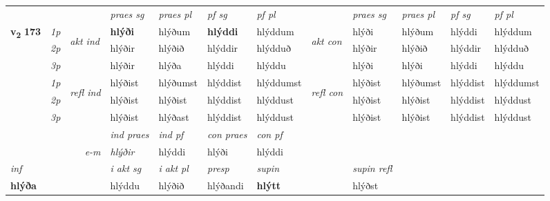 \begin{longtable}[l]{X>{\footnotesize\itshape}llXXXXlXXXX}
 & &   & \textit{praes sg}  & \textit{praes pl}    & \textit{ pf sg} & \textit{pf pl} & & \textit{praes sg}  & \textit{praes pl}    & \textit{pf sg} & \textit{pf pl }  \\ \cmidrule{4-7} \cmidrule{9-12}
 \multirow{2}{*}{{{\textbf{v{\textsubscript{2}}} \Large{\textbf{173}}}}}  & 1p & \multirow{3}{*}{\begin{turn}{90}\textit{akt ind}\end{turn}} & \textbf{hlýði} & hlýðum & \textbf{hlýddi} & hlýddum & \multirow{3}{*}{\begin{turn}{90}\textit{akt con}\end{turn}} &hlýði & hlýðum & hlýddi & hlýddum\\*
 & 2p &  &  hlýðir  & hlýðið & hlýddir & hlýdduð & & hlýðir & hlýðið & hlýddir & hlýdduð \\*
 & 3p &  & hlýðir & hlýða & hlýddi & hlýddu & & hlýði & hlýði& hlýddi & hlýddu \\*
\cmidrule{4-7} \cmidrule{9-12}
 & 1p & \multirow{3}{*}{\begin{turn}{90}\textit{refl ind}\end{turn}}  & hlýðist & hlýðumst & hlýddist & hlýddumst & \multirow{3}{*}{\begin{turn}{90}\textit{refl con}\end{turn}}  &hlýðist & hlýðumst & hlýddist & hlýddumst \\*
 & 2p &  & hlýðist & hlýðist & hlýddist & hlýddust & &hlýðist & hlýðist & hlýddist & hlýddust \\*
 & 3p  & & hlýðist & hlýðast & hlýddist & hlýddust & & hlýðist & hlýðist& hlýddist & hlýddust \\*
\cmidrule{4-7} \cmidrule{9-12}

   && &  \textit{ind praes} & \textit{ind pf} & \textit{con praes} & \textit{con pf} \\*
\multicolumn{3}{r}{\textit{e-m}} & hlýðir & hlýddi & hlýði & hlýddi \\*

\cmidrule{4-7}
   {\textit{inf}} & &  & \textit{i akt sg} & \textit{i akt pl}   & \textit{presp} & \textit{supin} && \textit{supin refl}  \\*
  {\textbf{hlýða}} & && hlýddu  & hlýðið   & hlýðandi &  \textbf{hlýtt} && hlýðst  \\*

\midrule


\end{longtable}
